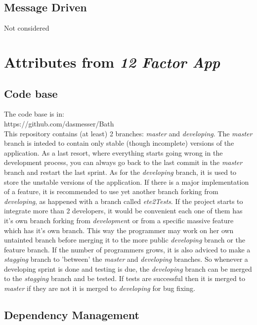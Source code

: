\documentclass[10pt]{article}
\begin{document}
 \subsection{Message Driven}
 
 Not considered
 
\section{Attributes from {\em 12 Factor App}}
 \subsection{Code base}
 
The code base is in:\\

https://github.com/dasmesser/Bath\\

This repository contains (at least) 2 branches: \textit{master} and \textit{developing}. The \textit{master} branch is inteded to contain only stable (though incomplete) versions of the application. As a last resort, where everything starts going wrong in the development process, you can always go back to the last commit in the \textit{master} branch and restart the last sprint. As for the \textit{developing} branch, it is used to store the unstable versions of the application.
If there is a major implementation of a feature, it is recommended to use yet another branch forking from \textit{developing}, as happened with a branch called \textit{ete2Tests}.
If the project starts to integrate more than 2 developers, it would be convenient each one of them has it's own branch forking from \textit{developmen}t or from a specific massive feature which has it's own branch. This way the programmer may work on her own untainted branch before merging it to the more public \textit{developing} branch or the feature branch.
If the number of  programmers grows, it is also adviced to make a \textit{stagging} branch to 'between' the \textit{master} and \textit{developing} branches. So whenever a developing sprint is done and testing is due, the \textit{developing} branch can be merged to the \textit{stagging} branch and be tested. If tests are successful then it is merged to \textit{master} if they are not it is merged to \textit{developing} for bug fixing.
 
 \subsection{Dependency Management}
 
\end{document}
